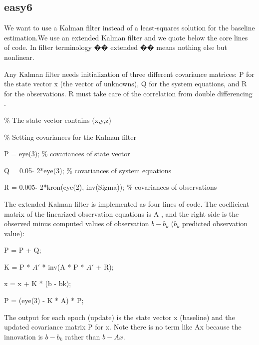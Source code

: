 \subsection{easy6}

We want to use a Kalman filter instead of a least-squares solution for the baseline estimation.We use an extended Kalman filter and we quote below the core lines of code. In filter terminology �� extended �� means nothing else but nonlinear.

Any Kalman filter needs initialization of three different covariance matrices: P for the state vector x (the vector of unknowns), Q for the system equations, and R for the observations. R must take care of the correlation from double differencing .

\% The state vector contains (x,y,z)

\% Setting covariances for the Kalman filter

P = eye(3); \% covariances of state vector

Q = 0.05 $\hat{}$ 2*eye(3); \% covariances of system equations

R = 0.005 $\hat{}$ 2*kron(eye(2), inv(Sigma)); \% covariances of observations

The extended Kalman filter is implemented as four lines of code. The coefficient matrix of the linearized observation equations is A , and the right side is the observed minus computed values of observation $b-b_{k}$ ($b_{k}$ predicted observation value):

P = P + Q;

K = P * $A'$ * inv(A * P * $A'$ + R);

x = x + K * (b - bk);

P = (eye(3) - K * A) * P;

The output for each epoch (update) is the state vector x (baseline) and the updated covariance matrix P for x. Note there is no term like Ax because the innovation is $b-b_{k}$ rather
than $b-Ax$.
